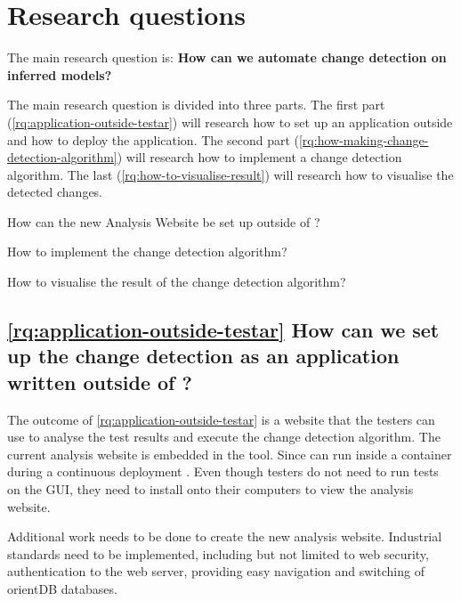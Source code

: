 \section{Research questions} \label{research-questions}

The main research question is: \textbf{How can we automate change detection on inferred \testar models?}

The main research question is divided into three parts. The first part (\ref{rq:application-outside-testar}) will research how to set up an application outside \testar and how to deploy the application. The second part (\ref{rq:how-making-change-detection-algorithm}) will research how to implement a change detection algorithm. The last (\ref{rq:how-to-visualise-result}) will research how to visualise the detected changes. 

\begin{questions}

    \item How can the new Analysis Website be set up outside of \testar? \label{rq:application-outside-testar}

    \item How to implement the change detection algorithm? \label{rq:how-making-change-detection-algorithm}
    
    \item How to visualise the result of the change detection algorithm? \label{rq:how-to-visualise-result}

\end{questions}

\subsection{\ref{rq:application-outside-testar} How can we set up the change detection as an application written outside of \testar?}

The outcome of \ref{rq:application-outside-testar} is a website that the testers can use to analyse the test results and execute the change detection algorithm. The current analysis website is embedded in the \testar tool. Since \testar can run inside a container during a continuous deployment \cite{thesisSlomp}. Even though testers do not need \testar to run tests on the GUI, they need to install \testar onto their computers to view the analysis website. 

Additional work needs to be done to create the new analysis website. Industrial standards need to be implemented, including but not limited to web security, authentication to the web server, providing easy navigation and switching of orientDB databases. 


